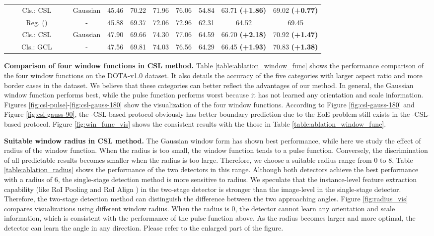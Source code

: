 \documentclass[10pt,journal,compsoc]{IEEEtran}
\begin{document}
\begin{table*}[tb!]
{\begin{tabular}{c|c|c|c|c|c|c|c|c|c|c|c|c}
			& & Cls.: CSL & &  & Gaussian & 45.46 & 70.22 & 71.96 & 76.06 & 54.84 & 63.71 \textbf{(+1.86)} & 69.02 \textbf{(+0.77)}  \\
			\cline{2-13}
			& \multirow{3}{*}{} & Reg. () &  & & - & 45.88 & 69.37 & 72.06 & 72.96 & 62.31 & 64.52 & 69.45 \\
			& & Cls.: CSL & & & Gaussian & 47.90 & 69.66 & 74.30 & 77.06 & 64.59 & 66.70 \textbf{(+2.18)} & 70.92 \textbf{(+1.47)} \\
			& & Cls.: GCL & & & - & 47.56 & 69.81 & 74.03 & 76.56 & 64.29 & 66.45 \textbf{(+1.93)} & 70.83 \textbf{(+1.38)} \\
			\bottomrule
	\end{tabular}}
	\label{table:ablation_csl_gcl}
\end{table*}

\noindent \textbf{Comparison of four window functions in CSL method.} Table \ref{table:ablation_window_func} shows the performance comparison of the four window functions on the DOTA-v1.0 dataset. It also details the accuracy of the five categories with larger aspect ratio and more border cases in the dataset. We believe that these categories can better reflect the advantages of our method. In general, the Gaussian window function performs best, while the pulse function performs worst because it has not learned any orientation and scale information. Figures \ref{fig:csl-pulse}-\ref{fig:csl-gauss-180} show the visualization of the four window functions. According to Figure \ref{fig:csl-gauss-180} and Figure \ref{fig:csl-gauss-90}, the -CSL-based protocol obviously has better boundary prediction due to the EoE problem still exists in the -CSL-based protocol. Figure \ref{fig:win_func_vis} shows the consistent results with the those in Table \ref{table:ablation_window_func}.

\noindent \textbf{Suitable window radius in CSL method.}  The Gaussian window form has shown best performance, while here we study the effect of radius of the window function. When the radius is too small, the window function tends to a pulse function. Conversely, the discrimination of all predictable results becomes smaller when the radius is too large. Therefore, we choose a suitable radius range from 0 to 8, Table \ref{table:ablation_radius} shows the performance of the two detectors in this range. Although both detectors achieve the best performance with a radius of 6, the single-stage detection method is more sensitive to radius. We speculate that the instance-level feature extraction capability (like RoI Pooling \cite{girshick2015fast} and RoI Align \cite{he2017mask}) in the two-stage detector is stronger than the image-level in the single-stage detector. Therefore, the two-stage detection method can distinguish the difference between the two approaching angles. Figure \ref{fig:radius_vis} compares visualizations using different window radius. When the radius is 0, the detector cannot learn any orientation and scale information, which is consistent with the performance of the pulse function above. As the radius becomes larger and more optimal, the detector can learn the angle in any direction. Please refer to the enlarged part of the figure.
\end{document}
